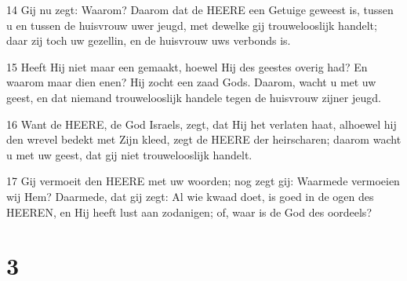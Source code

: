 \par 14 Gij nu zegt: Waarom? Daarom dat de HEERE een Getuige geweest is, tussen u en tussen de huisvrouw uwer jeugd, met dewelke gij trouwelooslijk handelt; daar zij toch uw gezellin, en de huisvrouw uws verbonds is.
\par 15 Heeft Hij niet maar een gemaakt, hoewel Hij des geestes overig had? En waarom maar dien enen? Hij zocht een zaad Gods. Daarom, wacht u met uw geest, en dat niemand trouwelooslijk handele tegen de huisvrouw zijner jeugd.
\par 16 Want de HEERE, de God Israels, zegt, dat Hij het verlaten haat, alhoewel hij den wrevel bedekt met Zijn kleed, zegt de HEERE der heirscharen; daarom wacht u met uw geest, dat gij niet trouwelooslijk handelt.
\par 17 Gij vermoeit den HEERE met uw woorden; nog zegt gij: Waarmede vermoeien wij Hem? Daarmede, dat gij zegt: Al wie kwaad doet, is goed in de ogen des HEEREN, en Hij heeft lust aan zodanigen; of, waar is de God des oordeels?

\chapter{3}

